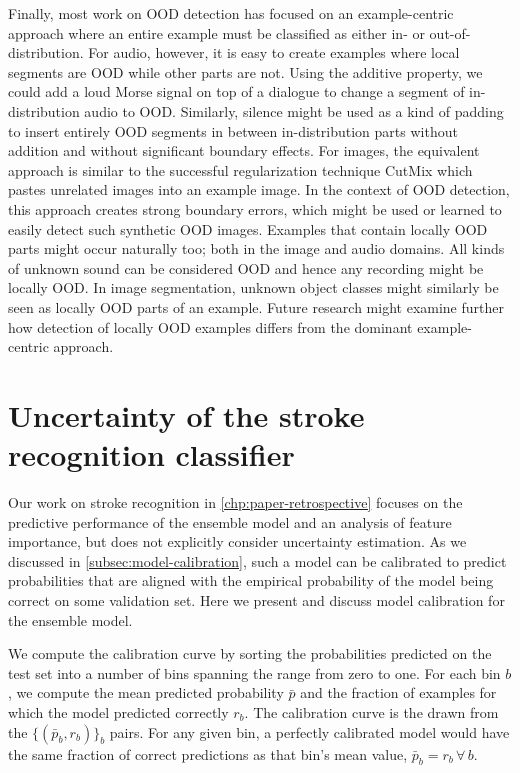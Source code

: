 Finally, most work on OOD detection has focused on an example-centric approach where an entire example must be classified as either in- or out-of-distribution. 
For audio, however, it is easy to create examples where local segments are OOD while other parts are not. 
Using the additive property, we could add a loud Morse signal on top of a dialogue to change a segment of in-distribution audio to OOD. 
Similarly, silence might be used as a kind of padding to insert entirely OOD segments in between in-distribution parts without addition and without significant boundary effects. 
For images, the equivalent approach is similar to the successful regularization technique CutMix \parencite{yun_cutmix_2019} which pastes unrelated images into an example image. In the context of OOD detection, this approach creates strong boundary errors, which might be used or learned to easily detect such synthetic OOD images. 
Examples that contain locally OOD parts might occur naturally too; both in the image and audio domains. All kinds of unknown sound can be considered OOD and hence any recording might be locally OOD. In image segmentation, unknown object classes might similarly be seen as locally OOD parts of an example. Future research might examine further how detection of locally OOD examples differs from the dominant example-centric approach. 


\section{Uncertainty of the stroke recognition classifier} \label{sec: discussion-stroke-recognition-uncertainty}

Our work on stroke recognition in \cref{chp:paper-retrospective} focuses on the predictive performance of the ensemble model and an analysis of feature importance, but does not explicitly consider uncertainty estimation. 
As we discussed in \cref{subsec:model-calibration}, such a model can be calibrated to predict probabilities that are aligned with the empirical probability of the model being correct on some validation set. Here we present and discuss model calibration for the ensemble model. 

We compute the calibration curve by sorting the probabilities predicted on the test set into a number of bins spanning the range from zero to one. For each bin $b$, we compute the mean predicted probability $\bar{p}$ and the fraction of examples for which the model predicted correctly $r_{b}$. The calibration curve is the drawn from the $\{(\bar{p}_{b}, r_{b})\}_b$ pairs. For any given bin, a perfectly calibrated model would have the same fraction of correct predictions as that bin's mean value, $\bar{p}_{b} = r_{b}\,\forall\,b$. 

